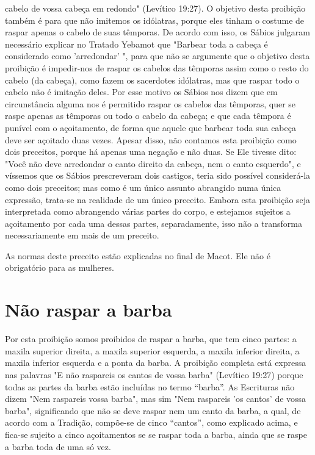 cabelo de vossa cabeça em redondo" (Levítico 19:27). O objetivo desta
proibi­ção também é para que não imitemos os idólatras, porque eles
tinham o costu­me de raspar apenas o cabelo de suas têmporas. De acordo
com isso, os Sábios julgaram necessário explicar no Tratado Yebamot que
"Barbear toda a cabeça é considerado como 'arredondar' ", para que não
se argumente que o objetivo desta proibição é impedir-nos de raspar os
cabelos das têmporas assim como o resto do cabelo (da cabeça), como
fazem os sacerdotes idólatras, mas que ras­par todo o cabelo não é
imitação deles. Por esse motivo os Sábios nos dizem que em circunstância
alguma nos é permitido raspar os cabelos das têmporas, quer se raspe
apenas as têmporas ou todo o cabelo da cabeça; e que cada têm­pora é
punível com o açoitamento, de forma que aquele que barbear toda sua
cabeça deve ser açoitado duas vezes. Apesar disso, não contamos esta
proibi­ção como dois preceitos, porque há apenas uma negação e não duas.
Se Ele tivesse dito: "Você não deve arredondar o canto direito da
cabeça, nem o can­to esquerdo", e víssemos que os Sábios prescreveram
dois castigos, teria sido possível considerá-la como dois preceitos; mas
como é um único assunto abran­gido numa única expressão, trata-se na
realidade de um único preceito. Embo­ra esta proibição seja interpretada
como abrangendo várias partes do corpo, e estejamos sujeitos a
açoitamento por cada uma dessas partes, separadamente, isso não a
transforma necessariamente em mais de um preceito.

As normas deste preceito estão explicadas no final de Macot. Ele não é
obrigatório para as mulheres.

\section{Não raspar a barba}

Por esta proibição somos proibidos de raspar a barba, que tem cin­co
partes: a maxila superior direita, a maxila superior esquerda, a maxila
infe­rior direita, a maxila inferior esquerda e a ponta da barba. A
proibição comple­ta está expressa nas palavras "E não raspareis os
cantos de vossa barba" (Levíti­co 19:27) porque todas as partes da barba
estão incluídas no termo ``barba''. As Escrituras não dizem "Nem raspareis
vossa barba", mas sim "Nem raspareis 'os cantos' de vossa barba",
significando que não se deve raspar nem um canto da barba, a qual, de
acordo com a Tradição, compõe-se de cinco ``cantos'', co­mo explicado
acima, e fica-se sujeito a cinco açoitamentos se se raspar toda a barba,
ainda que se raspe a barba toda de uma só vez.

